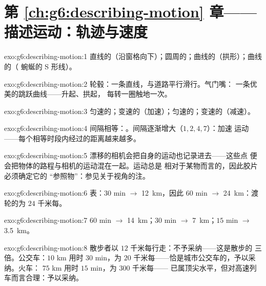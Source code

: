 \section*{第 \ref{ch:g6:describing-motion} 章——描述运动：轨迹与速度}

\begin{solution}{exo:g6:describing-motion:1}
直线的（沿窗格向下）；圆周的；曲线的（拱形）；曲线的（
蜿蜒的 S 形线）。
\end{solution}

\begin{solution}{exo:g6:describing-motion:2}
轮毂：一条直线，与道路平行滑行。气门嘴：
一条优美的跳跃曲线——升起、拱起，
每转一圈触地一次。
\end{solution}

\begin{solution}{exo:g6:describing-motion:3}
匀速的；变速的（加速）；匀速的；变速的（减速）。
\end{solution}

\begin{solution}{exo:g6:describing-motion:4}
间隔相等：。间隔逐渐增大（$1, 2, 4, 7$）：加速
运动——每个相等时段内经过的距离越来越多。
\end{solution}

\begin{solution}{exo:g6:describing-motion:5}
漂移的相机会把自身的运动也记录进去——这些点
便会把物体的路程与相机的运动混在一起。运动总是
相对于某物而言的，因此胶片必须确定它的
“参照物”：参见关于视角的注。
\end{solution}

\begin{solution}{exo:g6:describing-motion:6}
表：$30$ min $\to$ \qty{12}{km}，因此 $60$ min $\to$
\qty{24}{km}：渡轮的为 $24$ 千米每。
\end{solution}

\begin{solution}{exo:g6:describing-motion:7}
$60$ min $\to$ \qty{14}{km}；$30$ min $\to$ \qty{7}{km}；$15$ min
$\to$ \qty{3.5}{km}。
\end{solution}

\begin{solution}{exo:g6:describing-motion:8}
散步者以 $12$ 千米每行走：不予采纳——这是散步的
三倍。公交车：$10$ km 用时 $30$ min，为 $20$
千米每——恰是城市公交车的，予以采纳。火车：
$75$ km 用时 $15$ min，为 $300$ 千米每——
已属顶尖水平，但对高速列车而言合理：予以采纳。
\end{solution}

